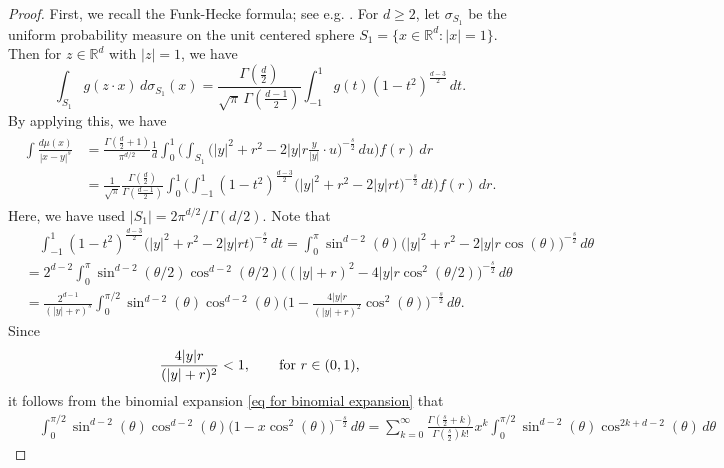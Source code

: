 \documentclass[10pt]{amsart}
\def\R{\mathbb{R}}
\theoremstyle{plain}
\theoremstyle{remark}
\numberwithin{equation}{section}
\begin{document}
\begin{proof}
First, we recall the Funk-Hecke formula; see e.g. \cite[Appendix A.2]{CSW22}. For $d \ge 2$, let $\sigma_{S_1}$ be the uniform probability measure on the unit centered sphere $S_1= \{ x\in\R^d: |x|=1 \}. $ Then for $ z \in \R^d $ with $|z|=1$, we have 
\begin{equation} \label{eq for Funk-Hecke}
\int_{ S_1 } g(z \cdot x) \,d\sigma_{S_1}(x) = \frac{ \Gamma( \frac{d}{2} ) }{ \sqrt{\pi}\, \Gamma( \frac{d-1}{2} ) } \int_{-1}^1 g(t) (1-t^2)^{ \frac{d-3}{2} }\,dt. 
\end{equation}
By applying this, we have 
\begin{align}
\begin{split} \label{2.8}
\int \frac{ d\mu(x) }{ |x-y|^s } & =\frac{ \Gamma(\frac{d}{2}+1) }{\pi^{ d/2 }} \frac{1}{d} \int_0^1 \bigg( \int_{ S_1 } \Big( |y|^2+r^2-2|y|r \frac{y}{|y|} \cdot u \Big)^{ -\frac{s}{2} } \,du \bigg) f(r)\,dr
\\
&=  \frac{ 1  }{ \sqrt{\pi} }  \frac{  \Gamma(\frac{d}{2} ) }{   \Gamma( \frac{d-1}{2} ) }    \int_0^1 \bigg( \int_{-1}^1   (1-t^2)^{ \frac{d-3}{2} } \Big( |y|^2+r^2-2|y|r t \Big)^{ -\frac{s}{2} }   \,dt \bigg) f(r)\,dr.   
\end{split}
\end{align}
Here, we have used $|S_1|= 2\pi^{d/2}/\Gamma(d/2)$. 
Note that 
\begin{align*}
&\quad \int_{-1}^1   (1-t^2)^{ \frac{d-3}{2} } \Big( |y|^2+r^2-2|y|r t \Big)^{ -\frac{s}{2} }   \,dt  = \int_0^{\pi}  \sin^{ d-2 }(\theta) \Big( |y|^2+r^2-2|y|r \cos(\theta) \Big)^{ -\frac{s}{2} }   \,d\theta 
 \\
 &= 2^{d-2}\int_0^{\pi} \sin^{ d-2 }(\theta/2)\cos^{d-2}(\theta/2) \Big( (|y|+r)^2-4|y|r \cos^2(\theta/2) \Big)^{ -\frac{s}{2} }    \,d\theta 
 \\
 &= \frac{ 2^{d-1} }{ (|y|+r)^s } \int_0^{\pi/2}  \sin^{ d-2 }(\theta)\cos^{d-2}(\theta) \Big( 1-\frac{4|y|r}{ (|y|+r)^2 } \cos^2(\theta) \Big)^{ -\frac{s}{2} }    \,d\theta . 
\end{align*}
Since 
$$
\frac{4|y|r}{(|y|+r)^2}<1, \qquad \textup{for } r \in (0,1), 
$$
it follows from the binomial expansion \eqref{eq for binomial expansion} that
\begin{align*}
&\quad  \int_0^{\pi/2}  \sin^{ d-2 }(\theta)\cos^{d-2}(\theta) \Big( 1-x \cos^2(\theta) \Big)^{ -\frac{s}{2} }    \,d\theta  =  \sum_{k=0}^\infty \frac{ \Gamma(\frac{s}{2}+k) }{ \Gamma(\frac{s}{2}) k! }x^k   \int_0^{\pi/2}  \sin^{d-2}(\theta)\cos^{2k+d-2}(\theta) \, d\theta   

\end{align*}
\end{proof}
\end{document}
